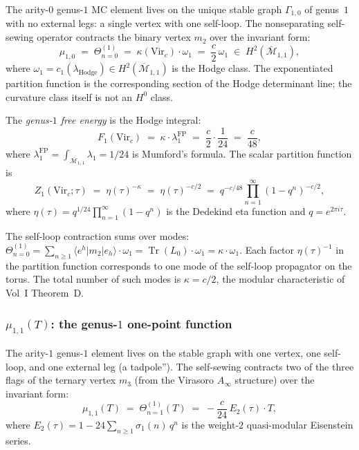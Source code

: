 \documentclass[11pt]{article}
\begin{document}
The arity-$0$ genus-$1$ MC element lives on the unique stable graph
$\Gamma_{1,0}$ of genus~$1$ with no external legs: a single vertex
with one self-loop.  The nonseparating self-sewing operator contracts
the binary vertex $m_2$ over the invariant form:
\begin{equation}\label{eq:wn-mu10}
\mu_{1,0}
\;=\;
\Theta^{(1)}_{n=0}
\;=\;
\kappa(\mathrm{Vir}_c) \cdot \omega_1
\;=\;
\frac{c}{2}\,\omega_1
\;\in\; H^2(\overline{\mathcal{M}}_{1,1}),
\end{equation}
where $\omega_1 = c_1(\lambda_{\mathrm{Hodge}}) \in
H^2(\overline{\mathcal{M}}_{1,1})$ is the Hodge class.  The
exponentiated partition function is the corresponding section of
the Hodge determinant line; the curvature class itself is not an
$H^0$ class.

The \emph{genus-$1$ free energy} is the Hodge integral:
\[
F_1(\mathrm{Vir}_c)
\;=\;
\kappa \cdot \lambda_1^{\mathrm{FP}}
\;=\;
\frac{c}{2} \cdot \frac{1}{24}
\;=\;
\frac{c}{48},
\]
where $\lambda_1^{\mathrm{FP}} = \int_{\overline{\mathcal{M}}_{1,1}}
\lambda_1 = 1/24$ is Mumford's formula.  The scalar partition function is
\begin{equation}\label{eq:wn-partition}
Z_1(\mathrm{Vir}_c;\tau)
\;=\;
\eta(\tau)^{-\kappa}
\;=\;
\eta(\tau)^{-c/2}
\;=\;
q^{-c/48}\prod_{n=1}^{\infty}(1-q^n)^{-c/2},
\end{equation}
where $\eta(\tau) = q^{1/24}\prod_{n=1}^\infty(1-q^n)$ is the
Dedekind eta function and $q = e^{2\pi i\tau}$.

\begin{remark}
The self-loop contraction sums over modes:
$\Theta^{(1)}_{n=0} = \sum_{n \geq 1} \langle e^h | m_2 | e_h \rangle
\cdot \omega_1 = \operatorname{Tr}(L_0) \cdot \omega_1 =
\kappa \cdot \omega_1$.
Each factor $\eta(\tau)^{-1}$ in the partition function corresponds
to one mode of the self-loop propagator on the torus.  The total
number of such modes is $\kappa = c/2$, the modular characteristic
of Vol~I Theorem~D.
\end{remark}

\subsubsection{$\mu_{1,1}(T)$: the genus-$1$ one-point function}

The arity-$1$ genus-$1$ element lives on the stable graph with one
vertex, one self-loop, and one external leg (a tadpole'').  The
self-sewing contracts two of the three flags of the ternary vertex $m_3$
(from the Virasoro $A_\infty$ structure) over the invariant form:
\begin{equation}\label{eq:wn-mu11}
\mu_{1,1}(T)
\;=\;
\Theta^{(1)}_{n=1}(T)
\;=\;
-\frac{c}{24}\,E_2(\tau)\cdot T,
\end{equation}
where $E_2(\tau) = 1 - 24\sum_{n \geq 1}\sigma_1(n)\,q^n$ is the
weight-$2$ quasi-modular Eisenstein series.
\end{document}
